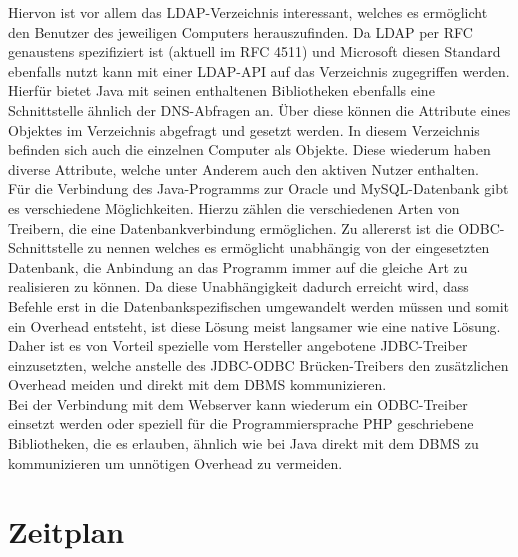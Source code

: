 Hiervon ist vor allem das LDAP-Verzeichnis interessant, welches es ermöglicht den Benutzer des jeweiligen Computers herauszufinden.
Da LDAP per RFC genaustens spezifiziert ist (aktuell im RFC 4511) und Microsoft diesen Standard ebenfalls nutzt kann mit einer LDAP-API auf das Verzeichnis zugegriffen werden.\\
Hierfür bietet Java mit seinen enthaltenen Bibliotheken ebenfalls eine Schnittstelle ähnlich der DNS-Abfragen an. Über diese können die Attribute eines Objektes im Verzeichnis abgefragt und gesetzt werden. In diesem Verzeichnis befinden sich auch die einzelnen Computer als Objekte. Diese wiederum haben diverse Attribute, welche unter Anderem auch den aktiven Nutzer enthalten.\\
Für die Verbindung des Java-Programms zur Oracle und MySQL-Datenbank gibt es verschiedene Möglichkeiten. Hierzu zählen die verschiedenen Arten von Treibern, die eine Datenbankverbindung ermöglichen. Zu allererst ist die ODBC-Schnittstelle zu nennen welches es ermöglicht unabhängig von der eingesetzten Datenbank, die Anbindung an das Programm immer auf die gleiche Art zu realisieren zu können. Da diese Unabhängigkeit dadurch erreicht wird, dass Befehle erst in die Datenbankspezifischen umgewandelt werden müssen und somit ein Overhead entsteht, ist diese Lösung meist langsamer wie eine native Lösung. Daher ist es von Vorteil spezielle vom Hersteller angebotene JDBC-Treiber einzusetzten, welche anstelle des JDBC-ODBC Brücken-Treibers den zusätzlichen Overhead meiden und direkt mit dem DBMS kommunizieren.\\
Bei der Verbindung mit dem Webserver kann wiederum ein ODBC-Treiber einsetzt werden oder speziell für die Programmiersprache PHP geschriebene Bibliotheken, die es erlauben, ähnlich wie bei Java direkt mit dem DBMS zu kommunizieren um unnötigen Overhead zu vermeiden.\\

\section{Zeitplan}
\label{sec:timetable}

